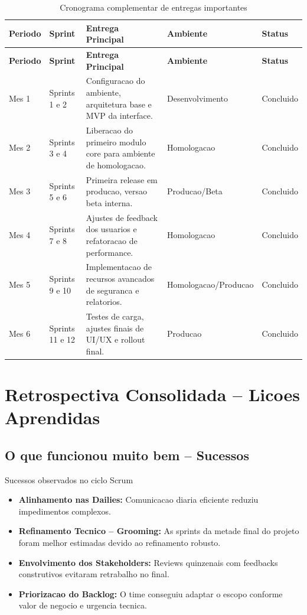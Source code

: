 \documentclass[12pt,a4paper]{article}
\begin{document}
\begin{longtable}{@{}L{2.4cm}L{2.4cm}L{6.1cm}L{2.5cm}C{2.2cm}@{}}
  \caption{Cronograma complementar de entregas importantes}\\
  \toprule
  \textbf{Periodo} & \textbf{Sprint} & \textbf{Entrega Principal} & \textbf{Ambiente} & \textbf{Status} \\
  \midrule
  \endfirsthead
  \toprule
  \textbf{Periodo} & \textbf{Sprint} & \textbf{Entrega Principal} & \textbf{Ambiente} & \textbf{Status} \\
  \midrule
  \endhead
  Mes 1 & Sprints 1 e 2 & Configuracao do ambiente, arquitetura base e MVP da interface. & Desenvolvimento & Concluido \\
  Mes 2 & Sprints 3 e 4 & Liberacao do primeiro modulo core para ambiente de homologacao. & Homologacao & Concluido \\
  Mes 3 & Sprints 5 e 6 & Primeira release em producao, versao beta interna. & Producao/Beta & Concluido \\
  Mes 4 & Sprints 7 e 8 & Ajustes de feedback dos usuarios e refatoracao de performance. & Homologacao & Concluido \\
  Mes 5 & Sprints 9 e 10 & Implementacao de recursos avancados de seguranca e relatorios. & Homologacao/Producao & Concluido \\
  Mes 6 & Sprints 11 e 12 & Testes de carga, ajustes finais de UI/UX e rollout final. & Producao & Concluido \\
  \bottomrule
\end{longtable}

\section{Retrospectiva Consolidada -- Licoes Aprendidas}

\subsection{O que funcionou muito bem -- Sucessos}

\begin{successbox}{Sucessos observados no ciclo Scrum}
  \begin{itemize}[leftmargin=1.2em, itemsep=0.5em]
    \item \textbf{Alinhamento nas Dailies:} Comunicacao diaria eficiente reduziu impedimentos complexos.
    \item \textbf{Refinamento Tecnico -- Grooming:} As sprints da metade final do projeto foram melhor estimadas devido ao refinamento robusto.
    \item \textbf{Envolvimento dos Stakeholders:} Reviews quinzenais com feedbacks construtivos evitaram retrabalho no final.
    \item \textbf{Priorizacao do Backlog:} O time conseguiu adaptar o escopo conforme valor de negocio e urgencia tecnica.
  \end{itemize}
\end{successbox}
\end{document}
